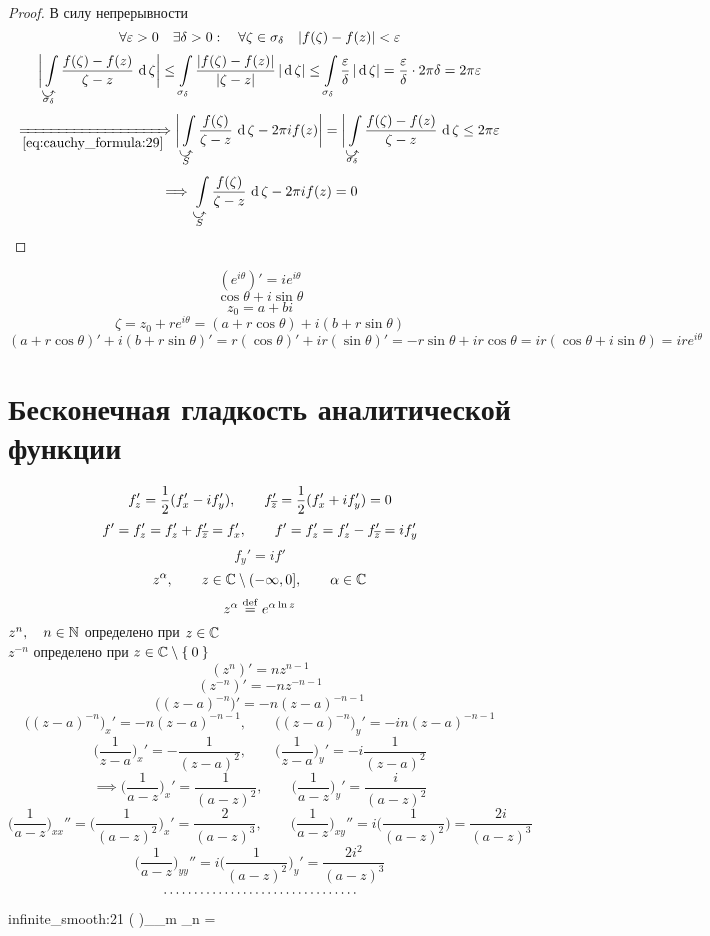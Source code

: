 \begin{proof}
	В силу непрерывности
	$$ \forall \varepsilon > 0 \quad \exists \delta > 0 : \quad \forall \zeta \in \sigma_\delta \quad |f(\zeta) - f(z)| < \varepsilon $$
	$$ \bigg| \cint[\zeta]{\curvedir{\sigma_\delta}}{\frac{f(\zeta) - f(z)}{\zeta - z}} \bigg| \le \acint[\zeta]{\sigma_\delta}{\frac{|f(\zeta) - f(z)|}{|\zeta - z|}} \le \acint[\zeta]{\sigma_\delta}{\frac\eps\delta} = \frac\eps\delta \cdot 2\pi \delta = 2\pi \eps $$
	$$ \underimp{\eref{cauchy_formula:29}} \bigg| \cint[\zeta]{\curvedir S}{ \frac{f(\zeta)}{\zeta - z}} - 2 \pi i f(z) \bigg| = \bigg| \cint[\zeta]{\curvedir{\sigma_\delta}}{\frac{f(\zeta) - f(z)}{\zeta - z}} \le 2\pi \eps $$
	$$ \implies \cint[\zeta]{\curvedir S}{\frac{f(\zeta)}{\zeta - z}} - 2\pi i f(z) = 0 $$
\end{proof}

\begin{remark}
	$$ (e^{i\theta})' = ie^{i\theta} $$
	$$ \cos \theta + i \sin \theta $$
	$$ z_0 = a + bi $$
	$$ \zeta = z_0 + re^{i\theta} = (a + r\cos \theta) + i(b + r \sin \theta) $$
	$$ (a + r\cos \theta)' + i(b + r\sin \theta)' = r(\cos \theta)' + ir(\sin \theta)' = -r \sin \theta + i r \cos \theta = ir (\cos \theta + i \sin \theta) = ire^{i\theta} $$
\end{remark}

\section{Бесконечная гладкость аналитической функции}

\begin{remark}
	$$ f_z' = \frac12(f_x' - if_y'), \qquad f_{\overline z}' = \frac12(f_x' + if_y') = 0 $$
	$$ f' = f_z' = f'_z + f_{\overline z}' = f_x', \qquad f' = f_z' = f_z' - f_{\overline z}' = if_y' $$
	$$ f_y' = if' $$
	$$ z^\alpha, \qquad z \in \mathbb{C} \setminus (-\infty, 0], \qquad \alpha \in \mathbb{C} $$
	$$ z^\alpha \stackrel{\operatorname{def}}{=} e^{\alpha \ln z} $$
	$ z^n, \quad n \in \mathbb{N} $ определено при $ z \in \mathbb{C} $ \\
	$ z^{-n} $ определено при $ z \in \mathbb{C} \setminus \Set 0 $
	$$ (z^n)' = nz^{n - 1} $$
	$$ (z^{-n})' = -nz^{-n - 1} $$
	$$ \bigg( (z - a)^{-n} \bigg)' = -n(z - a)^{-n - 1} $$
	$$ \bigg( (z - a)^{-n} \bigg)_x' = -n(z - a)^{-n - 1}, \qquad \bigg( (z - a)^{-n} \bigg)_y' = -in(z - a)^{-n - 1} $$
	$$ \bigg( \frac1{z - a} \bigg)_x' = - \frac1{(z - a)^2}, \qquad \bigg( \frac1{z - a} \bigg)_y' = -i \frac1{(z - a)^2} $$
	$$ \implies \bigg( \frac1{a - z} \bigg)_x' = \frac1{(a - z)^2}, \qquad \bigg( \frac1{a - z} \bigg)_y' = \frac{i}{(a - z)^2} $$
	$$ \bigg( \frac1{a - z} \bigg)_{xx}'' = \bigg( \frac1{(a - z)^2} \bigg)_x' = \frac2{(a - z)^3}, \qquad \bigg( \frac1{a - z} \bigg)_{xy}'' = i \bigg( \frac1{(a - z)^2} \bigg) = \frac{2i}{(a - z)^3} $$
	$$ \bigg( \frac1{a - z} \bigg)_{yy}'' = i \bigg( \frac1{(a - z)^2} \bigg)_y' = \frac{2i^2}{(a - z)^3} $$
	$$ \widedots[5cm] $$
	\begin{equ}{infinite_smooth:21}
		\bigg(  \bigg)_{_m _n} = 
	\end{equ}
\end{remark}

